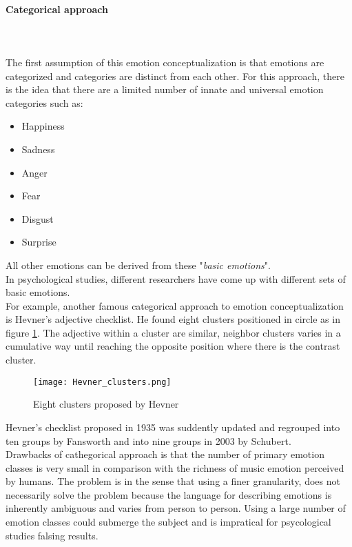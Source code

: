 \paragraph{Categorical approach}
\mbox{} \\ \\ \indent
The first assumption of this emotion conceptualization is that emotions are categorized and categories are distinct from each other. For this approach, there is the idea that there are a limited number of innate and universal emotion categories such as:
\begin{itemize}
	\item Happiness
	\item Sadness
	\item Anger
	\item Fear
	\item Disgust
	\item Surprise
\end{itemize}
All other emotions can be derived from these "\textit{basic emotions}".
\\
In psychological studies, different researchers have come up with different sets of basic emotions.
\\
For example, another famous categorical approach to emotion conceptualization is Hevner's adjective checklist. He found eight clusters positioned in circle as in figure \ref{fig:Hevner_clusters}. The adjective within a cluster are similar, neighbor clusters varies in a cumulative way until reaching the opposite position where there is the contrast cluster. 
\begin{figure}[h]
    \centering
    \texttt{[image: Hevner\_clusters.png]} 
	\caption{Eight clusters proposed by Hevner}
    \label{fig:Hevner_clusters}
\end{figure}
Hevner's checklist proposed in 1935 was suddently updated and regrouped into ten groups by Fansworth and into nine groups in 2003 by Schubert.
\\ \indent
Drawbacks of cathegorical approach is that the number of primary emotion classes is very small in comparison with the richness of music emotion perceived by humans. The problem is in the sense that using a finer granularity, does not necessarily solve the problem because the language for describing emotions is inherently ambiguous and varies from person to person. Using a large number of emotion classes could submerge the subject and is impratical for psycological studies falsing results.

